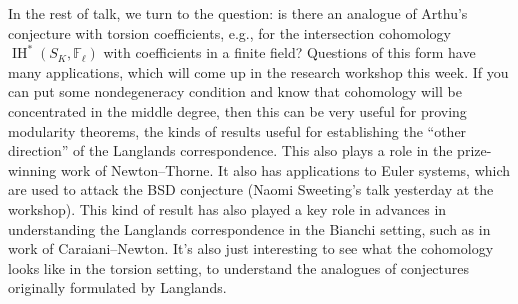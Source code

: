 \documentclass[reqno]{amsart} 
\begin{document}
In the rest of talk, we turn to the question: is there an analogue of Arthu's conjecture with torsion coefficients, e.g., for the intersection cohomology $\operatorname{IH}^\ast(S_K, \mathbb{F}_{\ell})$ with coefficients in a finite field?  Questions of this form have many applications, which will come up in the research workshop this week.  If you can put some nondegeneracy condition and know that cohomology will be concentrated in the middle degree, then this can be very useful for proving modularity theorems, the kinds of results useful for establishing the ``other direction'' of the Langlands correspondence.  This also plays a role in the prize-winning work of Newton--Thorne.  It also has applications to Euler systems, which are used to attack the BSD conjecture (Naomi Sweeting's talk yesterday at the workshop).  This kind of result has also played a key role in advances in understanding the Langlands correspondence in the Bianchi setting, such as in work of Caraiani--Newton.  It's also just interesting to see what the cohomology looks like in the torsion setting, to understand the analogues of conjectures originally formulated by Langlands.
\end{document}
